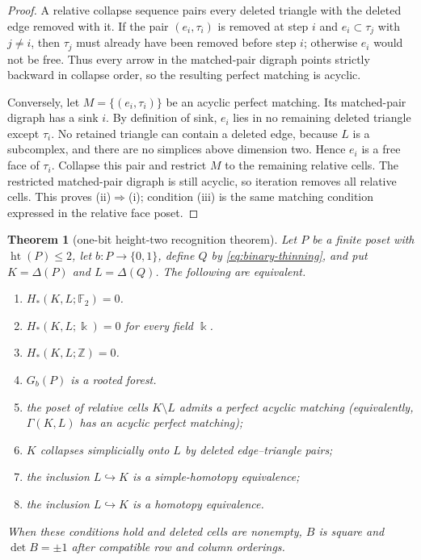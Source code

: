 \documentclass[11pt]{article}
\newtheorem{theorem}{Theorem}[section]
\theoremstyle{definition}
\theoremstyle{remark}
\DeclareMathOperator{\posht}{ht}
\newcommand{\Z}{\mathbb Z}
\newcommand{\Ftwo}{\mathbb F_2}
\newcommand{\D}{\Delta}
\begin{document}
\begin{proof}
A relative collapse sequence pairs every deleted triangle with the deleted edge removed
with it.  If the pair $(e_i,\tau_i)$ is removed at step $i$ and $e_i\subset\tau_j$
with $j\ne i$, then $\tau_j$ must already have been removed before step $i$; otherwise
$e_i$ would not be free.  Thus every arrow in the matched-pair digraph points strictly
backward in collapse order, so the resulting perfect matching is acyclic.

Conversely, let $M=\{(e_i,\tau_i)\}$ be an acyclic perfect matching.  Its
matched-pair digraph has a sink $i$.  By definition of sink, $e_i$ lies in no remaining
deleted triangle except $\tau_i$.  No retained triangle can contain a deleted edge,
because $L$ is a subcomplex, and there are no simplices above dimension two.  Hence
$e_i$ is a free face of $\tau_i$.  Collapse this pair and restrict $M$ to the remaining
relative cells.  The restricted matched-pair digraph is still acyclic, so iteration
removes all relative cells.  This proves (ii)$\Rightarrow$(i); condition (iii) is the
same matching condition expressed in the relative face poset.
\end{proof}

\begin{theorem}[one-bit height-two recognition theorem]\label{thm:main}
Let $P$ be a finite poset with $\posht(P)\le2$, let $b:P\to\{0,1\}$, define $Q$ by
\eqref{eq:binary-thinning}, and put $K=\D(P)$ and $L=\D(Q)$.  The following are
equivalent.
\begin{enumerate}[label=(\roman*)]
\item $H_*(K,L;\Ftwo)=0$.
\item $H_*(K,L;\Bbbk)=0$ for every field $\Bbbk$.
\item $H_*(K,L;\Z)=0$.
\item $G_b(P)$ is a rooted forest.
\item the poset of relative cells $K\setminus L$ admits a perfect acyclic matching
(equivalently, $\Gamma(K,L)$ has an acyclic perfect matching);
\item $K$ collapses simplicially onto $L$ by deleted edge--triangle pairs;
\item the inclusion $L\hookrightarrow K$ is a simple-homotopy equivalence;
\item the inclusion $L\hookrightarrow K$ is a homotopy equivalence.
\end{enumerate}
When these conditions hold and deleted cells are nonempty, $B$ is square and
$\det B=\pm1$ after compatible row and column orderings.
\end{theorem}
\end{document}

